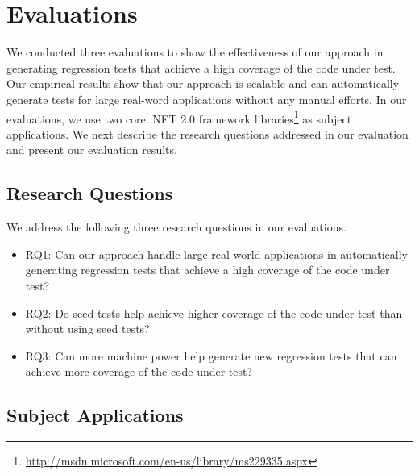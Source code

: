 \section{Evaluations}
\label{sec:eval}

We conducted three evaluations to show the effectiveness of our approach in generating regression tests that achieve a high coverage of the code under test. Our empirical results show that our approach is scalable and can automatically generate tests for large real-word applications without any manual efforts. In our evaluations,  we use two core .NET 2.0 framework libraries\footnote{\url{http://msdn.microsoft.com/en-us/library/ms229335.aspx}} as subject applications. We next describe the research questions addressed in our evaluation and present our evaluation results.


\subsection{Research Questions}
\label{sec:research}

We address the following three research questions in our evaluations.

\begin{itemize}
\item RQ1: Can our approach handle large real-world applications in automatically generating regression tests that achieve a high coverage of the code under test? 
\item RQ2: Do seed tests help achieve higher coverage of the code under test than without using seed tests?
\item RQ3: Can more machine power help generate new regression tests that can achieve more coverage of the code under test?
\end{itemize}

\subsection{Subject Applications}

